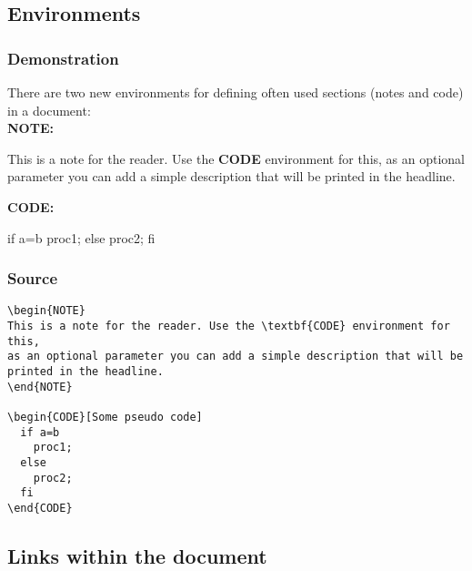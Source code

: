 \subsection{Environments}


\subsubsection{Demonstration}
There are two new environments for defining often used sections (notes and code) in a document:\\

\noindent
\textbf{NOTE:}\\

\begin{NOTE}
This is a note for the reader. Use the \textbf{CODE} environment for this,
as an optional parameter you can add a simple description that will be
printed in the headline.
\end{NOTE}
\vspace{0.4cm}

\noindent
\textbf{CODE:}\\

\begin{CODE}
  if a=b
    proc1;
  else
    proc2;
  fi
\end{CODE}


\subsubsection{Source}
\begin{verbatim}
\begin{NOTE}
This is a note for the reader. Use the \textbf{CODE} environment for this,
as an optional parameter you can add a simple description that will be
printed in the headline.
\end{NOTE}

\begin{CODE}[Some pseudo code]
  if a=b
    proc1;
  else
    proc2;
  fi
\end{CODE}
\end{verbatim}
\newpage


\subsection{Links within the document}


